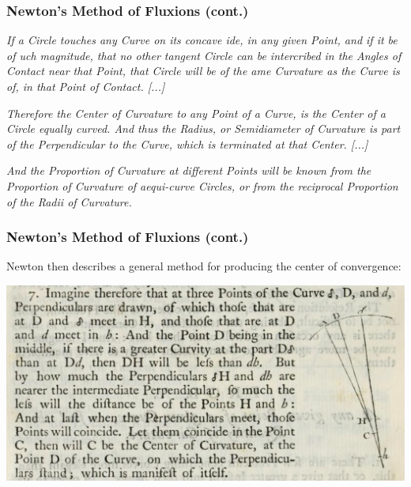 \documentclass{beamer}
\theoremstyle{definition}
\begin{document}
\begin{frame}
    \frametitle{Newton's Method of Fluxions (cont.)}

    \textit{If a Circle touches any Curve on its concave \textesh{}ide, in any given Point,
        and if it be of \textesh{}uch magnitude, that no other tangent Circle can be
        inter\textesh{}cribed in the Angles of Contact near that Point, that Circle
        will be of the \textesh{}ame Curvature as the Curve is of, in that Point of
        Contact. [...]
    }

    \textit{Therefore the Center of Curvature to any Point of a Curve, is the Center of a
        Circle equally curved. And thus the Radius, or Semidiameter of Curvature is
        part of the Perpendicular to the Curve, which is terminated at that Center.
        [...]
    }

    \textit{And the Proportion of Curvature at different Points will be known from
        the Proportion of Curvature of aequi-curve Circles, or from the reciprocal
        Proportion of the Radii of Curvature.
    }
\end{frame}

\begin{frame}
    \frametitle{Newton's Method of Fluxions (cont.)}

    Newton then describes a general method for producing the center of convergence: \cite{newton}

    \includegraphics[width=\textwidth]{images/newton-center-construction.png}

\end{frame}
\end{document}
